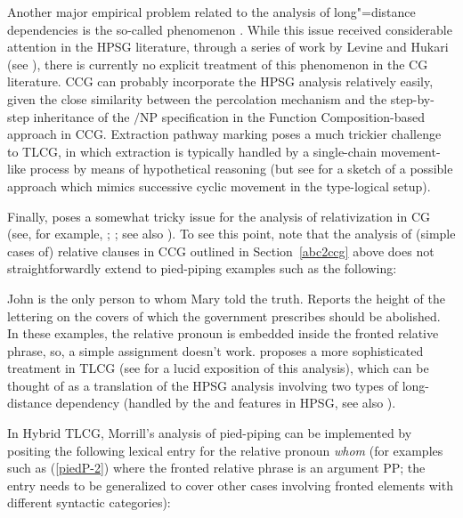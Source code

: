 \documentclass[output=paper,biblatex,babelshorthands,newtxmath,draftmode,colorlinks,citecolor=brown]{langscibook}
\begin{document}
Another major empirical problem related to the analysis of
long"=distance dependencies is the so-called  phenomenon \citep{mccloskey79,Zaenen83a-u}. While this issue
received considerable attention in the HPSG literature, through a
series of work by Levine and Hukari (see \citealt{LH2006a}), there is
currently no explicit treatment of this phenomenon in the CG
literature. CCG can probably incorporate the HPSG analysis relatively
easily, given the close similarity between the \slasch percolation
mechanism and the step-by-step inheritance of the $/$NP specification
in the Function Composition-based approach in CCG. Extraction pathway
marking poses a much trickier challenge to TLCG, in which extraction
is typically handled by a single-chain movement-like process by means
of hypothetical reasoning (but see 
for a sketch of a possible approach which mimics successive cyclic
movement in the type-logical setup).

Finally,\label{cg:page-pied-piping-start}  poses a somewhat tricky issue for the
analysis of relativization in CG (see, for example,
\citealt{Pollard88a,Morrill94a-u};
\citealt[Section~8.6]{MuellerGT-Eng3}; see also
). To see this point,
note that the analysis of (simple cases of) relative clauses in CCG
outlined in Section~\ref{abc2ccg} above does not straightforwardly
extend to pied-piping examples such as the following:

\ealnoraggedright
\label{piedP}
\ex\label{piedP-2}
    John is the only person to whom Mary told the truth.
\ex\label{piedP-1}
    Reports the height of the lettering on the covers of which the
    government prescribes should be abolished. \mbox{}\hfill{\mbox{\citep[109]{Ross67a}}}
\zl
In these examples, the relative pronoun is embedded inside
the fronted relative phrase, so, a simple 
assignment doesn't work.
\citet[Chapter~4, Section~3.3]{Morrill94a-u} proposes 
a more sophisticated treatment in TLCG (see \citealt[Section~9.7]{Carpenter98a-u}
for a lucid exposition of this analysis), which can be thought of as
a translation of the HPSG analysis \citep[Chapter~5]{ps2} involving two types
of long-distance dependency (handled by the
\REL and \SLASH features
in HPSG, see also ).

In Hybrid TLCG, Morrill's analysis of pied-piping
can be implemented by positing the following lexical entry for the
relative pronoun \textit{whom} (for examples such as (\ref{piedP-2}) where 
the fronted relative
phrase is an argument PP; the entry needs to be generalized to cover
other cases involving fronted elements with different syntactic categories): 
\end{document}
